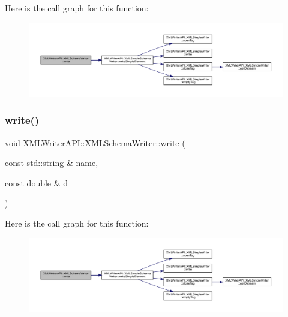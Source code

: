 Here is the call graph for this function\+:
\nopagebreak
\begin{figure}[H]
\begin{center}
\leavevmode
\includegraphics[width=350pt]{db/d34/classXMLWriterAPI_1_1XMLSchemaWriter_affbcfbac63240a8048b6b0940cc05c30_cgraph}
\end{center}
\end{figure}
\mbox{\label{classXMLWriterAPI_1_1XMLSchemaWriter_aaa0138613c826e77a63e5195bc742f07}} 
\subsubsection{\texorpdfstring{write()}{write()}\hspace{0.1cm}{\footnotesize\ttfamily [7/10]}}
{\footnotesize\ttfamily void X\+M\+L\+Writer\+A\+P\+I\+::\+X\+M\+L\+Schema\+Writer\+::write (\begin{DoxyParamCaption}\item[{const std\+::string \&}]{name,  }\item[{const double \&}]{d }\end{DoxyParamCaption})\hspace{0.3cm}{\ttfamily [inline]}}

Here is the call graph for this function\+:
\nopagebreak
\begin{figure}[H]
\begin{center}
\leavevmode
\includegraphics[width=350pt]{db/d34/classXMLWriterAPI_1_1XMLSchemaWriter_aaa0138613c826e77a63e5195bc742f07_cgraph}
\end{center}
\end{figure}
\mbox{\label{classXMLWriterAPI_1_1XMLSchemaWriter_aaa0138613c826e77a63e5195bc742f07}} 
